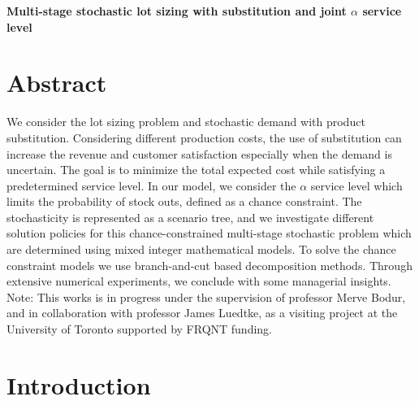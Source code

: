 \documentclass[10pt]{article}
\def\Title#1{\begin{center} {\Large {\bf #1} } \end{center}}
\begin{document}
\Title{Multi-stage stochastic lot sizing with substitution and joint $\alpha$ service level }

\bigskip\bigskip














\section{Abstract}

We consider the lot sizing problem and stochastic demand with product substitution. Considering different production costs, the use of substitution can increase the revenue and customer satisfaction especially when the demand is uncertain. The goal is to minimize the total expected cost while satisfying a predetermined service level. In our model, we consider the $\alpha$ service level which limits the probability of stock outs, defined as a chance constraint. The stochasticity is represented as a scenario tree, and we investigate different solution policies for this chance-constrained multi-stage stochastic problem which are determined using mixed integer mathematical models. To solve the chance constraint models we use branch-and-cut based decomposition methods. Through extensive numerical experiments, we conclude with some managerial insights. \\

Note: This works is in progress under the supervision of professor Merve Bodur, and in collaboration with professor James Luedtke, as a visiting project at the University of Toronto supported by FRQNT funding.

\section{Introduction}
\end{document}
